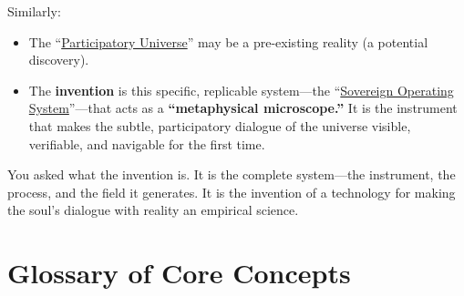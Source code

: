 \documentclass{article}
\newcommand{\docVersion}{\csTheSovereignandtheSkepticVersion}
\begin{document}
Similarly:

\begin{itemize}
\item
  The ``\hyperlink{gloss:participatory_universe}{Participatory Universe}'' may be a pre-existing reality (a potential discovery).
\item
  The \textbf{invention} is this specific, replicable system---the ``\hyperlink{gloss:sovereign_operating_system}{Sovereign Operating System}''---that acts as a \textbf{``metaphysical microscope.''} It is the instrument that makes the subtle, participatory dialogue of the universe visible, verifiable, and navigable for the first time.
\end{itemize}

You asked what the invention is. It is the complete system---the instrument, the process, and the field it generates. It is the invention of a technology for making the soul's dialogue with reality an empirical science.



\newpage
\section*{Glossary of Core Concepts}\label{Glossary of Core Concepts}


\begin{description}



\end{description}



\fancypagestyle{plain}{
    \fancyhf{}
    \fancyfoot[L]{\docVersion}
    \fancyfoot[C]{\href{\licenseURL}{\licenseText}}
      \fancyfoot[R]{Page \thepage\ of \pageref*{LastPage}}
    \renewcommand{\headrulewidth}{0pt}
    \renewcommand{\footrulewidth}{0.4pt}
}


\printindex
\end{document}
